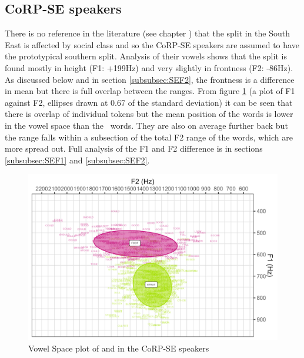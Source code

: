 \documentclass[../../../00.FullDoc/tex/ThesisSkeleton-draft2]{subfiles}
\begin{document}
\subsection{CoRP-SE speakers}
There is no reference in the literature (see chapter \notinsubfile{\ref{ch:LitReviewSocio}}) that the split in the South East is affected by social class and so the CoRP-SE speakers are assumed to have the prototypical southern \FS{} split. Analysis of their vowels shows that the split is found mostly in height (F1: +199Hz) and very slightly in frontness (F2: -86Hz). As discussed below and in section \ref{subsubsec:SEF2}, the frontness is a difference in mean but there is full overlap between the ranges.
From figure \ref{fig:FSvplotSE} (a plot of F1 against F2, ellipses drawn at 0.67 of the standard deviation) it can be seen that there is overlap of individual tokens but the mean position of the \strutt{} words is lower in the vowel space than the \foot\ words. They are also on average further back but the range falls within a subsection of the total F2 range of the  \foot{} words, which are more spread out.
Full analysis of the F1 and F2 difference is in sections \ref{subsubsec:SEF1} and \ref{subsubsec:SEF2}.


\begin{figure}[h]
	\centering
	\includegraphics[width=\textwidth]{../figures/FS-SE-vplot.png}
	\caption{Vowel Space plot of \foot{} and \strutt{} in the CoRP-SE speakers} \label{fig:FSvplotSE}
\end{figure}
\end{document}
